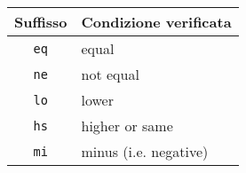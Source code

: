 \documentclass[varwidth=6in]{standalone}
\providecommand\lightrule{%
	\arrayrulecolor{black!30}%
	\midrule[\lightrulewidth]%
	\arrayrulecolor{black}%
}
\providecommand\suffix[1]{%
	\texttt{#1}%
}
\begin{document}
	\begin{tabular}{cl}
		\toprule
			Suffisso & Condizione verificata \\
		\midrule
			\suffix{eq} & equal \\\lightrule
			\suffix{ne} & not equal \\\lightrule
			\suffix{lo} & lower \\\lightrule
			\suffix{hs} & higher or same \\\lightrule
			\suffix{mi} & minus (i.e. negative) \\
		\bottomrule
	\end{tabular}
\end{document}
